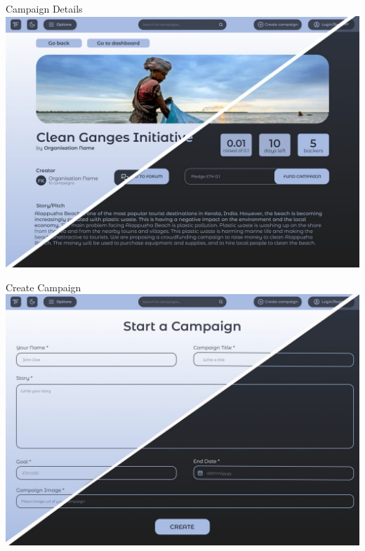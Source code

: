 \documentclass{beamer}
\begin{document}
\begin{frame}{Campaign Details}
    \includegraphics[width=\linewidth]{assets/ui/campaign-details.jpeg} 
\end{frame}
\begin{frame}{Create Campaign}
    \includegraphics[width=\linewidth]{assets/ui/start-campaign.jpeg} 
\end{frame}
\end{document}
